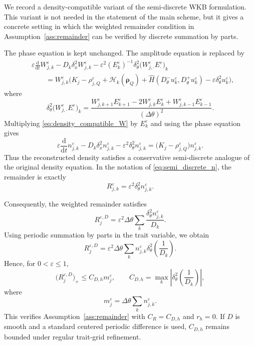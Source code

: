 \documentclass[11pt]{article}
\begin{document}
We record a density-compatible variant of the semi-discrete WKB formulation.
This variant is not needed in the statement of the main scheme, but it gives a
concrete setting in which the weighted remainder condition in
Assumption~\ref{ass:remainder} can be verified by discrete summation by parts.

The phase equation is kept unchanged.  The amplitude equation is replaced by
\begin{equation}
\label{eq:density_compatible_W}
\begin{aligned}
&\varepsilon
\frac{\mathrm d}{\mathrm dt}W_{j,k}^\varepsilon
-
D_k\delta_x^2W_{j,k}^\varepsilon
-
\varepsilon^2(E_k^\varepsilon)^{-1}
\delta_\theta^2
\bigl(W_{j,\cdot}^\varepsilon E_\cdot^\varepsilon\bigr)_k
\\
&\qquad =
W_{j,k}^\varepsilon
\bigl(
K_j-\rho_{j,Q}^\varepsilon
+\mathcal H_k(\boldsymbol\rho_Q)
+\widehat H(D_\theta^-u_k^\varepsilon,D_\theta^+u_k^\varepsilon)
-\varepsilon\delta_\theta^2u_k^\varepsilon
\bigr),
\end{aligned}
\end{equation}
where
\[
\delta_\theta^2
\bigl(W_{j,\cdot}^\varepsilon E_\cdot^\varepsilon\bigr)_k
=
\frac{
W_{j,k+1}^\varepsilon E_{k+1}^\varepsilon
-2W_{j,k}^\varepsilon E_k^\varepsilon
+W_{j,k-1}^\varepsilon E_{k-1}^\varepsilon
}{(\Delta\theta)^2}.
\]
Multiplying \eqref{eq:density_compatible_W} by \(E_k^\varepsilon\) and using
the phase equation gives
\begin{equation}
\label{eq:density_compatible_n}
\varepsilon\frac{\mathrm d}{\mathrm dt} n_{j,k}^\varepsilon
-
D_k\delta_x^2 n_{j,k}^\varepsilon
-
\varepsilon^2\delta_\theta^2 n_{j,k}^\varepsilon
=
\bigl(K_j-\rho_{j,Q}^\varepsilon\bigr)n_{j,k}^\varepsilon .
\end{equation}
Thus the reconstructed density satisfies a conservative semi-discrete analogue
of the original density equation.  In the notation of
\eqref{eq:semi_discrete_n}, the remainder is exactly
\[
    R_{j,k}^\varepsilon
    =
    \varepsilon^2\delta_\theta^2n_{j,k}^\varepsilon .
\]

Consequently, the weighted remainder satisfies
\[
    R_{j}^{\varepsilon,D}
    =
    \varepsilon^2\Delta\theta
    \sum_k
    \frac{\delta_\theta^2n_{j,k}^\varepsilon}{D_k}.
\]
Using periodic summation by parts in the trait variable, we obtain
\[
    R_{j}^{\varepsilon,D}
    =
    \varepsilon^2\Delta\theta
    \sum_k
    n_{j,k}^\varepsilon
    \delta_\theta^2\left(\frac{1}{D_k}\right).
\]
Hence, for \(0<\varepsilon\le 1\),
\[
    \bigl(R_{j}^{\varepsilon,D}\bigr)_+
    \le
    C_{D,h} m_j^\varepsilon,
    \qquad
    C_{D,h}
    =
    \max_k
    \left|
    \delta_\theta^2\left(\frac{1}{D_k}\right)
    \right|,
\]
where
\[
    m_j^\varepsilon
    =
    \Delta\theta\sum_k n_{j,k}^\varepsilon .
\]
This verifies Assumption~\ref{ass:remainder} with
\(C_R=C_{D,h}\) and \(r_h=0\).  If \(D\) is smooth and a standard centered
periodic difference is used, \(C_{D,h}\) remains bounded under regular
trait-grid refinement.
\end{document}
